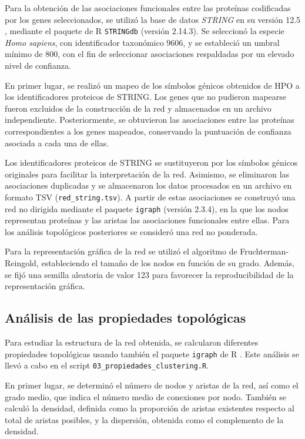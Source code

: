Para la obtención de las asociaciones funcionales entre las proteínas codificadas por los genes seleccionados, se utilizó la base de datos \textit{STRING} en su versión 12.5 \cite{Szklarczyk2025}, mediante el paquete de R \texttt{STRINGdb} (versión 2.14.3). Se seleccionó la especie \textit{Homo sapiens}, con identificador taxonómico 9606, y se estableció un umbral mínimo de 800, con el fin de seleccionar asociaciones respaldadas por un elevado nivel de confianza.

En primer lugar, se realizó un mapeo de los símbolos génicos obtenidos de HPO a los identificadores proteicos de STRING. Los genes que no pudieron mapearse fueron excluidos de la construcción de la red y almacenados en un archivo independiente. Posteriormente, se obtuvieron las asociaciones entre las proteínas correspondientes a los genes mapeados, conservando la puntuación de confianza asociada a cada una de ellas.

Los identificadores proteicos de STRING se sustituyeron por los símbolos génicos originales para facilitar la interpretación de la red. Asimismo, se eliminaron las asociaciones duplicadas y se almacenaron los datos procesados en un archivo en formato TSV (\texttt{red\_string.tsv}). A partir de estas asociaciones se construyó una red no dirigida mediante el paquete \texttt{igraph} (versión 2.3.4), en la que los nodos representan proteínas y las aristas las asociaciones funcionales entre ellas. Para los análisis topológicos posteriores se consideró una red no ponderada.

Para la representación gráfica de la red se utilizó el algoritmo de Fruchterman-Reingold, estableciendo el tamaño de los nodos en función de su grado. Además, se fijó una semilla aleatoria de valor 123 para favorecer la reproducibilidad de la representación gráfica.

\subsection{Análisis de las propiedades topológicas}

Para estudiar la estructura de la red obtenida, se calcularon diferentes propiedades topológicas usando también el paquete \texttt{igraph} de R \cite{Csardi2006}. Este análisis se llevó a cabo en el script \texttt{03\_propiedades\_clustering.R}.

En primer lugar, se determinó el número de nodos y aristas de la red, así como el grado medio, que indica el número medio de conexiones por nodo. También se calculó la densidad, definida como la proporción de aristas existentes respecto al total de aristas posibles, y la dispersión, obtenida como el complemento de la densidad.

